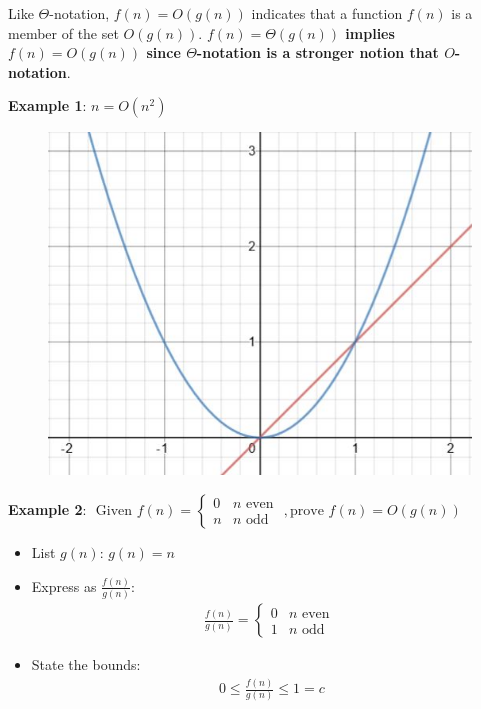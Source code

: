 \documentclass[10pt,a4paper]{article}
\begin{document}
Like $\Theta$-notation, $f(n)=O(g(n))$ indicates that a function $f(n)$ is a member of the set
$O(g(n))$. \textbf{$f(n)=\Theta(g(n))$ implies $f(n)=O(g(n))$ since $\Theta$-notation is a stronger
notion that $O$-notation}. \par 
 
\textbf{Example 1}: $n = O(n^2)$
\begin{figure} [h!]
    \centering
    \includegraphics[scale=0.4]{Omega graph.JPG}
\end{figure}

\textbf{Example 2}: $\text { Given } f(n)=\left\{\begin{array}{ll}
    0 & n \text { even } \\
    n & n \text { odd }
    \end{array},\right. \text {prove } f(n)=O(g(n))$
\begin{itemize}
    \item List $g(n)$: $g(n)=n$
    \item Express as $\frac{f(n)}{g(n)}$:
    \begin{align*}
        \frac{f(n)}{g(n)}=\left\{\begin{array}{ll}
            0 & n \text { even } \\
            1 & n \text { odd }
            \end{array}\right.
    \end{align*}
    \item State the bounds:
    \begin{align*}
        0 \leq \frac{f(n)}{g(n)} \leq 1=c
    \end{align*}
\end{itemize}
\end{document}
